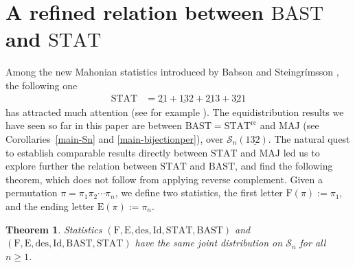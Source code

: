 \documentclass[12pt]{amsart}
\numberwithin{equation}{section}
\theoremstyle{plain}
\newtheorem{theorem}{Theorem}[section]
\theoremstyle{definition}
\def\MAJ{\mathrm{MAJ}}
\def\STAT{\mathrm{STAT}}
\def\BAST{\mathrm{BAST}}
\def\F{\mathrm{F}}
\def\L{\mathrm{E}}
\def\des{\mathrm{des}}
\def\rc{\mathrm{rc}}
\def\Id{\mathrm{Id}}
\def\SS{\mathcal{S}}
\begin{document}
\section{\texorpdfstring{A refined relation between $\BAST$ and $\STAT$}{}}\label{sec:stat-bast}

Among the new Mahonian statistics introduced by Babson and Steingr\'imsson \cite{BS}, the following one
\begin{align}\label{def:stat}
\STAT &=\underline{21}+\underline{13}2+\underline{21}3+\underline{32}1
\end{align}
has attracted much attention (see for example \cite{FZ,Bur,KV,CL,FHV}). The equidistribution results we have seen so far in this paper are between $\BAST=\STAT^{\rc}$ and $\MAJ$ (see Corollaries~\ref{main-Sn} and \ref{main-bijectionper}), over $\SS_n(1\underline{32})$. The natural quest to establish comparable results directly between $\STAT$ and $\MAJ$ led us to explore further the relation between $\STAT$ and $\BAST$, and find the following theorem, which does not follow from applying reverse complement. Given a permutation $\pi=\pi_1\pi_2\cdots\pi_n$, we define two statistics, the first letter $\F(\pi):=\pi_1$, and the ending letter $\L(\pi):=\pi_n$.
\begin{theorem}\label{thm:stat-bast}
Statistics $(\F, \L, \des, \Id, \STAT, \BAST)$ and
$(\F, \L, \des, \Id, \BAST, \STAT)$ have the same joint distribution on $\SS_n$ for all $n \geq 1$.
\end{theorem}
\end{document}
